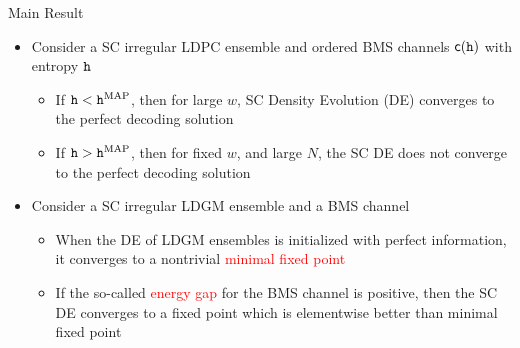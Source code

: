 \documentclass{beamer}
\newlength{\onecolwid}
\begin{document}
\begin{frame}
\begin{columns}[t]
\begin{column}{\onecolwid}
    \vspace{2cm}
    \begin{alertblock}{\Large Main Result}
      \begin{itemize}
      \item Consider a SC irregular LDPC ensemble and ordered BMS channels $\mathsf{c}(\texttt{h})$ with entropy $\texttt{h}$ 
        \begin{itemize}
        \item \vspace{0.75cm} If $\texttt{h} < \texttt{h}^{\mathrm{MAP}}$, then for large $w$, SC Density Evolution (DE) converges to the perfect decoding solution
        \item \vspace{0.75cm} If $\texttt{h} > \texttt{h}^{\mathrm{MAP}}$, then for fixed $w$, and large $N$, the SC DE does not converge to the perfect decoding solution
        \end{itemize}
        \vspace{1.5cm}
      \item Consider a SC irregular LDGM ensemble and a BMS channel
        \begin{itemize}
        \item \vspace{0.75cm} When the DE of LDGM ensembles is initialized with perfect information, it converges to a nontrivial \textcolor{red}{minimal fixed point}
        \item \vspace{0.75cm} If the so-called \textcolor{red}{energy gap} for the BMS channel is positive, then the SC DE converges to a fixed point which is elementwise better than minimal fixed point
        \end{itemize}
      \end{itemize}
    \end{alertblock}


\end{column}
\end{columns}
\end{frame}
\end{document}
